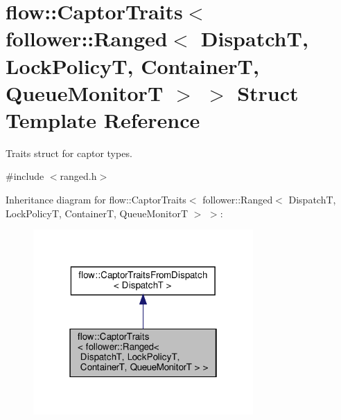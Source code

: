 \hypertarget{structflow_1_1_captor_traits_3_01follower_1_1_ranged_3_01_dispatch_t_00_01_lock_policy_t_00_01_c08104af94995091b5ab7569e730f476c}{}\section{flow\+:\+:Captor\+Traits$<$ follower\+:\+:Ranged$<$ DispatchT, Lock\+PolicyT, ContainerT, Queue\+MonitorT $>$ $>$ Struct Template Reference}
\label{structflow_1_1_captor_traits_3_01follower_1_1_ranged_3_01_dispatch_t_00_01_lock_policy_t_00_01_c08104af94995091b5ab7569e730f476c}


Traits struct for captor types.  




{\ttfamily \#include $<$ranged.\+h$>$}



Inheritance diagram for flow\+:\+:Captor\+Traits$<$ follower\+:\+:Ranged$<$ DispatchT, Lock\+PolicyT, ContainerT, Queue\+MonitorT $>$ $>$\+:
\nopagebreak
\begin{figure}[H]
\begin{center}
\leavevmode
\includegraphics[width=238pt]{structflow_1_1_captor_traits_3_01follower_1_1_ranged_3_01_dispatch_t_00_01_lock_policy_t_00_01_cf0e94e7986d512f1273b0e82b06e4a0b}
\end{center}
\end{figure}


